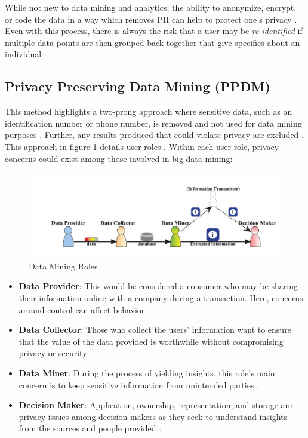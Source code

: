 \documentclass[sigconf]{acmart}
\begin{document}
While not new to data mining and analytics, the ability to anonymize, encrypt, or code the data in a way which removes PII can help to protect one's privacy \cite{Tene2012}. Even with this process, there is always the risk that a user may be \textit{re-identified} if multiple data points are then grouped back together that give specifics about an individual \cite{Francis2014}

\subsection{Privacy Preserving Data Mining (PPDM)} 

This method highlights a two-prong approach where sensitive data, such as an identification number or phone number, is removed and not used for data mining purposes \cite{Xu2014}. Further, any results produced that could violate privacy are excluded \cite{Xu2014}. This approach in figure \ref{f:Data Mining Roles} details user roles \cite{Xu2014}. Within each user role, privacy concerns could exist among those involved in big data mining:

\begin{figure}[!htb]
  \centering\includegraphics[width=\textwidth]{roles.jpg}
  \caption{Data Mining Roles}\label{f:Data Mining Roles}
\end{figure}

\begin{itemize}
 \item \textbf{Data Provider}: This would be considered a consumer who may be sharing their information online with a company during a transaction. Here, concerns around control can affect behavior \cite{Xu2014}
 \item \textbf{Data Collector}: Those who collect the users' information want to ensure that the value of the data provided is worthwhile without compromising privacy or security \cite{Xu2014}.
 \item \textbf{Data Miner}: During the process of yielding insights, this role's main concern is to keep sensitive information from unintended parties \cite{Xu2014}. 
 \item \textbf{Decision Maker}: Application, ownership, representation, and storage are privacy issues among decision makers as they seek to understand insights from the sources and people provided \cite{Xu2014}. 
 \end{itemize}
\end{document}
